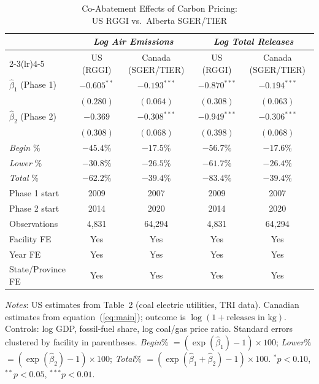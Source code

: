 \documentclass[12pt]{article}
\begin{document}
\begin{table}[htbp]
\centering
\caption{Co-Abatement Effects of Carbon Pricing:\\
         US RGGI vs.\ Alberta SGER/TIER}
\label{tab:main}
\small\setlength{\tabcolsep}{4pt}%
\begin{threeparttable}
\begin{tabular}{lcccc}
\toprule
& \multicolumn{2}{c}{\textit{Log Air Emissions}} &
  \multicolumn{2}{c}{\textit{Log Total Releases}} \\
\cmidrule(lr){2-3}\cmidrule(lr){4-5}
& US (RGGI) & Canada (SGER/TIER) & US (RGGI) & Canada (SGER/TIER) \\
\midrule
$\hat\beta_1$ (Phase 1) &
  $-0.605^{**}$ & $-0.193^{***}$ &
  $-0.870^{***}$ & $-0.194^{***}$ \\
&
  $(0.280)$ & $(0.064)$ &
  $(0.308)$ & $(0.063)$ \\[4pt]
$\hat\beta_2$ (Phase 2) &
  $-0.369$ & $-0.308^{***}$ &
  $-0.949^{***}$ & $-0.306^{***}$ \\
&
  $(0.308)$ & $(0.068)$ &
  $(0.398)$ & $(0.068)$ \\[6pt]
\textit{Begin} $\%$ &
  $-45.4\%$ & $-17.5\%$ &
  $-56.7\%$ & $-17.6\%$ \\
\textit{Lower} $\%$ &
  $-30.8\%$ & $-26.5\%$ &
  $-61.7\%$ & $-26.4\%$ \\
\textit{Total} $\%$ &
  $-62.2\%$ & $-39.4\%$ &
  $-83.4\%$ & $-39.4\%$ \\[6pt]
Phase 1 start & 2009 & 2007 & 2009 & 2007 \\
Phase 2 start & 2014 & 2020 & 2014 & 2020 \\
Observations & 4,831 & 64,294 & 4,831 & 64,294 \\
Facility FE & Yes & Yes & Yes & Yes \\
Year FE     & Yes & Yes & Yes & Yes \\
State/Province FE & Yes & Yes & Yes & Yes \\
\bottomrule
\end{tabular}
\begin{tablenotes}
\small
\item \textit{Notes}: US estimates from \citet{pham2024} Table~2
  (coal electric utilities, TRI data).
  Canadian estimates from equation~(\ref{eq:main}); outcome is
  $\log(1 + \text{releases in kg})$.
  Controls: log GDP, fossil-fuel share, log coal/gas price ratio.
  Standard errors clustered by facility in parentheses.
  \textit{Begin}\% $= (\exp(\hat\beta_1)-1)\times 100$;
  \textit{Lower}\% $= (\exp(\hat\beta_2)-1)\times 100$;
  \textit{Total}\% $= (\exp(\hat\beta_1+\hat\beta_2)-1)\times 100$.
  $^{*}p<0.10$, $^{**}p<0.05$, $^{***}p<0.01$.
\end{tablenotes}
\end{threeparttable}
\end{table}
\end{document}
